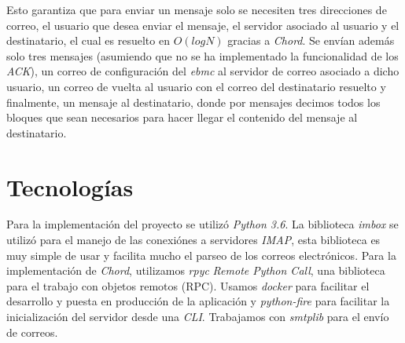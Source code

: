\documentclass[a4paper]{article}
\begin{document}
	
	Esto garantiza que para enviar un mensaje solo se necesiten tres direcciones de correo, el usuario que desea enviar el mensaje, el servidor asociado al usuario y el destinatario, el cual es resuelto en $O(logN)$ gracias a \emph{Chord}.
	Se envían además solo tres mensajes (asumiendo que no se ha implementado la funcionalidad de los \emph{ACK}), un correo de configuración del \emph{ebmc} al servidor de correo asociado a dicho usuario, un correo de vuelta al usuario con el correo del destinatario resuelto y finalmente, un mensaje al destinatario, donde por mensajes decimos todos los bloques que sean necesarios para hacer llegar el contenido del mensaje al destinatario.
	

\section{Tecnologías}\label{sec:tecnologías}
Para la implementación del proyecto se utilizó \emph{Python 3.6}.
La biblioteca \emph{imbox} se utilizó para el manejo de las conexiónes a servidores \emph{IMAP}, esta biblioteca es muy simple de usar y facilita mucho el parseo de los correos electrónicos.
Para la implementación de \emph{Chord}, utilizamos \emph{rpyc} \emph{Remote Python Call}, una biblioteca para el trabajo con objetos remotos (RPC).
Usamos \emph{docker} para facilitar el desarrollo y puesta en producción de la aplicación y \emph{python-fire} para facilitar la inicialización del servidor desde una \emph{CLI}.
Trabajamos con \emph{smtplib} para el envío de correos.
\end{document}
